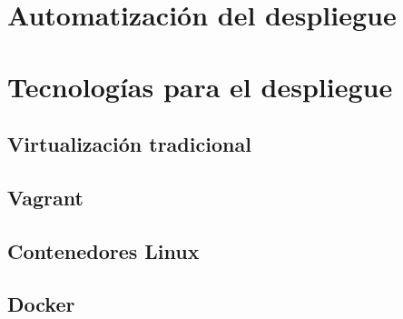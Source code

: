 \documentclass[11pt,a4paper]{article}
\begin{document}
\section{Automatización del despliegue}

\section{Tecnologías para el despliegue}

\subsection{Virtualización tradicional}

\subsection{Vagrant}

\subsection{Contenedores Linux}

\subsection{Docker}
\end{document}
